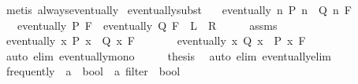 \begin{isabellebody}
%
\isatagproof
{}\isamarkupfalse%
\ {\isacharparenleft}{\kern0pt}metis\ always{\isacharunderscore}{\kern0pt}eventually{\isacharparenright}{\kern0pt}%
\endisatagproof
{\isafoldproof}%
%
\isadelimproof
\isanewline
%
\endisadelimproof
\isanewline
{}\isamarkupfalse%
\ eventually{\isacharunderscore}{\kern0pt}subst{\isacharcolon}{\kern0pt}\isanewline
\ \ \ {\isachardoublequoteopen}eventually\ {\isacharparenleft}{\kern0pt}{\isasymlambda}n{\isachardot}{\kern0pt}\ P\ n\ {\isacharequal}{\kern0pt}\ Q\ n{\isacharparenright}{\kern0pt}\ F{\isachardoublequoteclose}\isanewline
\ \ \ {\isachardoublequoteopen}eventually\ P\ F\ {\isacharequal}{\kern0pt}\ eventually\ Q\ F{\isachardoublequoteclose}\ {\isacharparenleft}{\kern0pt}\ {\isachardoublequoteopen}{\isacharquery}{\kern0pt}L\ {\isacharequal}{\kern0pt}\ {\isacharquery}{\kern0pt}R{\isachardoublequoteclose}{\isacharparenright}{\kern0pt}\isanewline
%
\isadelimproof
%
\endisadelimproof
%
\isatagproof
{}\isamarkupfalse%
\ {\isacharminus}{\kern0pt}\isanewline
\ \ \isamarkupfalse%
\ assms\ \isamarkupfalse%
\ {\isachardoublequoteopen}eventually\ {\isacharparenleft}{\kern0pt}{\isasymlambda}x{\isachardot}{\kern0pt}\ P\ x\ {\isasymlongrightarrow}\ Q\ x{\isacharparenright}{\kern0pt}\ F{\isachardoublequoteclose}\isanewline
\ \ \ \ \ \ \ {\isachardoublequoteopen}eventually\ {\isacharparenleft}{\kern0pt}{\isasymlambda}x{\isachardot}{\kern0pt}\ Q\ x\ {\isasymlongrightarrow}\ P\ x{\isacharparenright}{\kern0pt}\ F{\isachardoublequoteclose}\isanewline
\ \ \ \ \isamarkupfalse%
\ {\isacharparenleft}{\kern0pt}auto\ elim{\isacharcolon}{\kern0pt}\ eventually{\isacharunderscore}{\kern0pt}mono{\isacharparenright}{\kern0pt}\isanewline
\ \ \isamarkupfalse%
\ \isamarkupfalse%
\ {\isacharquery}{\kern0pt}thesis\ \isamarkupfalse%
\ {\isacharparenleft}{\kern0pt}auto\ elim{\isacharcolon}{\kern0pt}\ eventually{\isacharunderscore}{\kern0pt}elim{}{\isacharparenright}{\kern0pt}\isanewline
{}\isamarkupfalse%
%
\endisatagproof
{\isafoldproof}%
%
\isadelimproof
%
\endisadelimproof
%
\isadelimdocument
%
\endisadelimdocument
%
\isatagdocument
%
\isamarkuptrue%
%
\endisatagdocument
{\isafolddocument}%
%
\isadelimdocument
%
\endisadelimdocument
{}\isamarkupfalse%
\ frequently\ {\isacharcolon}{\kern0pt}{\isacharcolon}{\kern0pt}\ {\isachardoublequoteopen}{\isacharparenleft}{\kern0pt}{\isacharprime}{\kern0pt}a\ {\isasymRightarrow}\ bool{\isacharparenright}{\kern0pt}\ {\isasymRightarrow}\ {\isacharprime}{\kern0pt}a\ filter\ {\isasymRightarrow}\ bool{\isachardoublequoteclose}\isanewline

\end{isabellebody}
